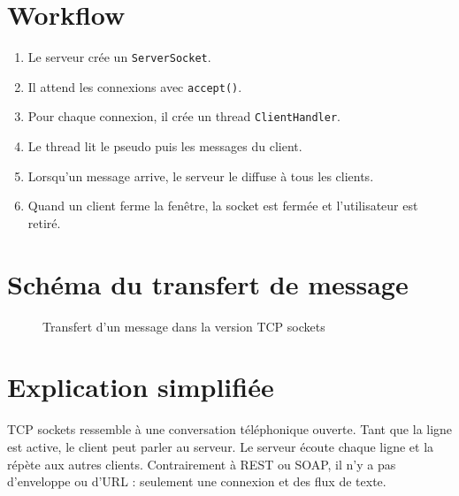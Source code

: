 \documentclass[12pt,a4paper]{report}
\begin{document}
\section{Workflow}

\begin{enumerate}
    \item Le serveur crée un \texttt{ServerSocket}.
    \item Il attend les connexions avec \texttt{accept()}.
    \item Pour chaque connexion, il crée un thread \texttt{ClientHandler}.
    \item Le thread lit le pseudo puis les messages du client.
    \item Lorsqu'un message arrive, le serveur le diffuse à tous les clients.
    \item Quand un client ferme la fenêtre, la socket est fermée et l'utilisateur est retiré.
\end{enumerate}

\section{Schéma du transfert de message}

\begin{figure}[H]
\centering
{}
\caption{Transfert d'un message dans la version TCP sockets}
\end{figure}

\section{Explication simplifiée}

TCP sockets ressemble à une conversation téléphonique ouverte. Tant que la ligne est active, le client peut parler au serveur. Le serveur écoute chaque ligne et la répète aux autres clients. Contrairement à REST ou SOAP, il n'y a pas d'enveloppe ou d'URL : seulement une connexion et des flux de texte.
\end{document}
